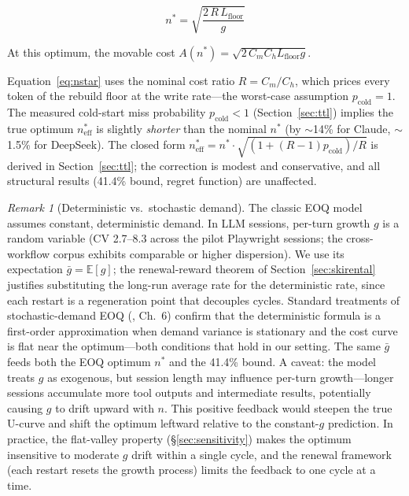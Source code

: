 \documentclass[11pt]{article}
\theoremstyle{definition}
\theoremstyle{remark}
\newtheorem{remark}[theorem]{Remark}
\begin{document}
\begin{equation}
n^* = \sqrt{\frac{2\,R\,L_{\text{floor}}}{g}}
\label{eq:nstar}
\end{equation}

At this optimum, the movable cost $A(n^*) = \sqrt{2\,C_m C_h L_{\text{floor}} g}$.

Equation~\eqref{eq:nstar} uses the nominal cost ratio $R = C_m/C_h$, which prices every token of the rebuild floor at the write rate---the worst-case assumption $p_{\text{cold}}=1$. The measured cold-start miss probability $p_{\text{cold}} < 1$ (Section~\ref{sec:ttl}) implies the true optimum $n^*_{\text{eff}}$ is slightly \emph{shorter} than the nominal $n^*$ (by $\sim$14\% for Claude, $\sim$1.5\% for DeepSeek). The closed form $n^*_{\text{eff}} = n^* \cdot \sqrt{(1+(R-1)p_{\text{cold}})/R}$ is derived in Section~\ref{sec:ttl}; the correction is modest and conservative, and all structural results (41.4\% bound, regret function) are unaffected.

\begin{remark}[Deterministic vs.\ stochastic demand]
The classic EOQ model assumes constant, deterministic demand. In LLM sessions, per-turn growth $g$ is a random variable (CV 2.7--8.3 across the pilot Playwright sessions; the cross-workflow corpus exhibits comparable or higher dispersion). We use its expectation $\bar{g} = \mathbb{E}[g]$; the renewal-reward theorem of Section~\ref{sec:skirental} justifies substituting the long-run average rate for the deterministic rate, since each restart is a regeneration point that decouples cycles. Standard treatments of stochastic-demand EOQ (\cite{silver2017}, Ch.~6) confirm that the deterministic formula is a first-order approximation when demand variance is stationary and the cost curve is flat near the optimum---both conditions that hold in our setting. The same $\bar{g}$ feeds both the EOQ optimum $n^*$ and the 41.4\% bound. A caveat: the model treats $g$ as exogenous, but session length may influence per-turn growth---longer sessions accumulate more tool outputs and intermediate results, potentially causing $g$ to drift upward with $n$. This positive feedback would steepen the true U-curve and shift the optimum leftward relative to the constant-$g$ prediction. In practice, the flat-valley property (\S\ref{sec:sensitivity}) makes the optimum insensitive to moderate $g$ drift within a single cycle, and the renewal framework (each restart resets the growth process) limits the feedback to one cycle at a time.
\end{remark}
\end{document}
